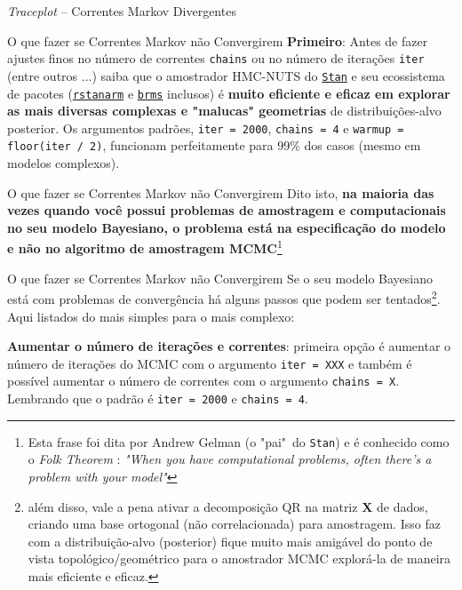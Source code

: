 \begin{frame}{\textit{Traceplot} -- Correntes Markov Divergentes}
  \begin{figure}
    \centering
    \resizebox{.4\linewidth}{!}{}
  \end{figure}
\end{frame}

\begin{frame}{O que fazer se Correntes Markov não Convergirem}
  \textbf{Primeiro}: Antes de fazer ajustes finos no número de correntes
  \texttt{chains} ou no número de iterações \texttt{iter} (entre outros ...)
  saiba que o amostrador HMC-NUTS do \href{https://mc-stan.org}{\texttt{Stan}} e
  seu ecossistema de pacotes (\href{http://mc-stan.org/rstanarm/}{\texttt{rstanarm}} e
  \href{https://paul-buerkner.github.io/brms/}{\texttt{brms}} inclusos) é \textbf{muito
  eficiente e eficaz em explorar as mais diversas complexas e "malucas" geometrias}
  de distribuições-alvo posterior.
  \vfill
  Os argumentos padrões, \texttt{iter = 2000}, \texttt{chains = 4} e
  \texttt{warmup = floor(iter / 2)}, funcionam perfeitamente para 99\% dos casos
  (mesmo em modelos complexos).
\end{frame}

\begin{frame}{O que fazer se Correntes Markov não Convergirem}
  \vfill
  Dito isto, \textbf{na maioria das vezes quando você
  possui problemas de amostragem e computacionais no seu modelo Bayesiano, o problema
  está na especificação do modelo e não no algoritmo de amostragem MCMC}\footnote{Esta
  frase foi dita por Andrew Gelman (o "pai"~do \texttt{Stan}) e é conhecido como o
  \textit{Folk Theorem} \parencite{gelmanFolkTheoremStatistical2008}:
  \textit{"When you have computational problems, often there’s a problem with
  your model"}}
\end{frame}

\begin{frame}{O que fazer se Correntes Markov não Convergirem}
  Se o seu modelo Bayesiano está com problemas de convergência há alguns
  passos que podem ser tentados\footnote{além disso,
  vale a pena ativar a decomposição QR na matriz $\mathbf{X}$ de dados, criando uma
  base ortogonal (não correlacionada) para amostragem. Isso faz com a distribuição-alvo
  (posterior) fique muito mais amigável do ponto de vista topológico/geométrico
  para o amostrador MCMC explorá-la de maneira mais eficiente e eficaz.}.
  Aqui listados do mais simples para o mais complexo:
  \begin{vfilleditems}
    \item \textbf{Aumentar o número de iterações e correntes}: primeira opção
    é aumentar o número de iterações do MCMC com o argumento \texttt{iter = XXX}
    e também é possível aumentar o número de correntes com o argumento
    \texttt{chains = X}. Lembrando que o padrão é \texttt{iter = 2000} e
    \texttt{chains = 4}.
  \end{vfilleditems}
\end{frame}

